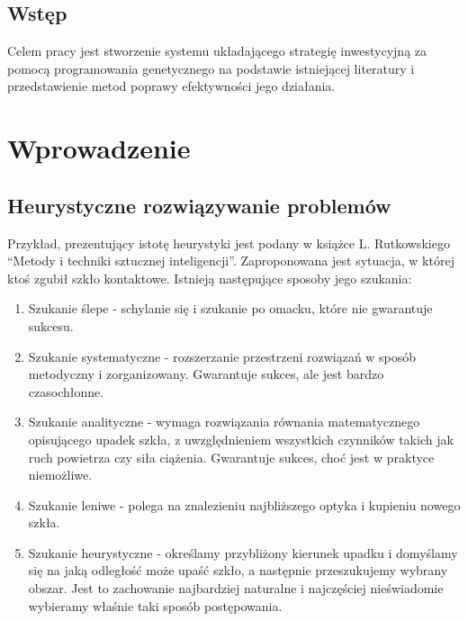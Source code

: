 \documentclass[twoside]{iisthesis}
\begin{document}
\section{Wstęp}

Celem pracy jest stworzenie systemu układającego strategię inwestycyjną za pomocą programowania genetycznego na podstawie istniejącej literatury i przedstawienie metod poprawy efektywności jego działania.


\chapter{Wprowadzenie}

\section{Heurystyczne rozwiązywanie problemów}

Przykład, prezentujący istotę heurystyki jest podany w książce L. Rutkowskiego ``Metody i techniki sztucznej inteligencji''. Zaproponowana jest sytuacja, w której ktoś zgubił szkło kontaktowe. Istnieją następujące sposoby jego szukania:

\begin{enumerate}
\item Szukanie ślepe - schylanie się i szukanie po omacku, które nie gwarantuje sukcesu.
\item Szukanie systematyczne - rozszerzanie przestrzeni rozwiązań w sposób metodyczny i zorganizowany. Gwarantuje sukces, ale jest bardzo czasochłonne.
\item Szukanie analityczne - wymaga rozwiązania równania matematycznego opisującego upadek szkła, z uwzględnieniem wszystkich czynników takich jak ruch powietrza czy siła ciążenia. Gwarantuje sukces, choć jest w praktyce niemożliwe.
\item Szukanie leniwe - polega na znalezieniu najbliższego optyka i kupieniu nowego szkła.
\item Szukanie heurystyczne - określamy przybliżony kierunek upadku i domyślamy się na jaką odległość może upaść szkło, a następnie przeszukujemy wybrany obszar. Jest to zachowanie najbardziej naturalne i najczęściej nieświadomie wybieramy właśnie taki sposób postępowania.
\end{enumerate}
\end{document}
